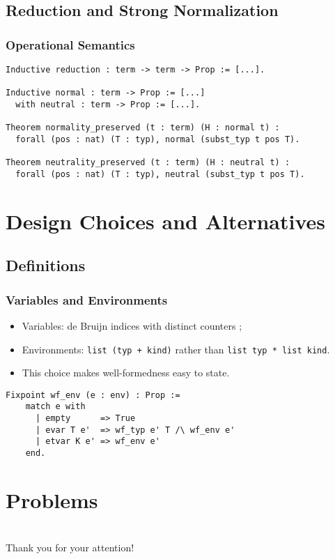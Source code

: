 \documentclass{beamer}
\begin{document}
\subsection{Reduction and Strong Normalization}

\begin{frame}[fragile]

\frametitle{Operational Semantics}

\begin{verbatim}
Inductive reduction : term -> term -> Prop := [...].

Inductive normal : term -> Prop := [...]
  with neutral : term -> Prop := [...].

Theorem normality_preserved (t : term) (H : normal t) :
  forall (pos : nat) (T : typ), normal (subst_typ t pos T).

Theorem neutrality_preserved (t : term) (H : neutral t) :
  forall (pos : nat) (T : typ), neutral (subst_typ t pos T).
\end{verbatim}


\end{frame}

\section{Design Choices and Alternatives}

\subsection{Definitions}

\begin{frame}[fragile]

\frametitle{Variables and Environments}

\begin{itemize}
\item Variables: de Bruijn indices with distinct counters ;
\item Environments: \verb|list (typ + kind)| rather than
  \verb|list typ * list kind|.
\item This choice makes well-formedness easy to state.
\end{itemize}

\begin{verbatim}
Fixpoint wf_env (e : env) : Prop :=
    match e with
      | empty      => True
      | evar T e'  => wf_typ e' T /\ wf_env e'
      | etvar K e' => wf_env e'
    end.
\end{verbatim}

\end{frame}

\section{Problems}

\begin{frame}
\end{frame}

\section*{}

\begin{frame}[fragile]
  \begin{center}
    Thank you for your attention!
  \end{center}
\end{frame}
\end{document}
